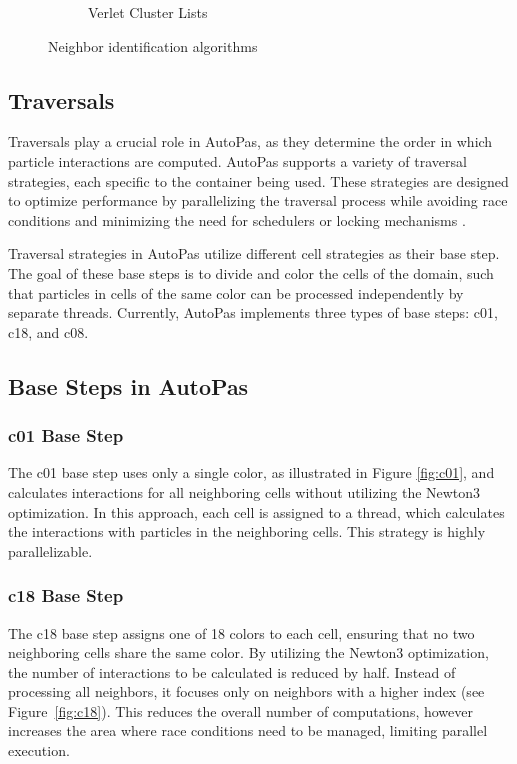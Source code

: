\begin{figure}[h!]
\begin{subfigure}{0.22\textwidth}
        \caption{\scriptsize Verlet Cluster Lists}
        \label{fig:verletclusters}
    \end{subfigure}
    \caption{Neighbor identification algorithms \parencite{gratl2022n}}
\end{figure}



\subsection{Traversals}

Traversals play a crucial role in AutoPas, as they determine the order in which particle interactions are computed. AutoPas supports a variety of traversal strategies, each specific to the container being used. These strategies are designed to optimize performance by parallelizing the traversal process while avoiding race conditions and minimizing the need for schedulers or locking mechanisms \parencite{gratl2019autopas}.

Traversal strategies in AutoPas utilize different cell strategies as their base step. The goal of these base steps is to divide and color the cells of the domain, such that particles in cells of the same color can be processed independently by separate threads. Currently, AutoPas implements three types of base steps: c01, c18, and c08. 

\subsection{Base Steps in AutoPas}

\subsubsection{c01 Base Step} The c01 base step uses only a single color, as illustrated in Figure \ref{fig:c01}, and calculates interactions for all neighboring cells without utilizing the Newton3 optimization. In this approach, each cell is assigned to a thread, which calculates the interactions with particles in the neighboring cells. This strategy is highly parallelizable.

\subsubsection{c18 Base Step} The c18 base step assigns one of 18 colors to each cell, ensuring that no two neighboring cells share the same color. By utilizing the Newton3 optimization, the number of interactions to be calculated is reduced by half. Instead of processing all neighbors, it focuses only on neighbors with a higher index (see Figure~\ref{fig:c18}). This reduces the overall number of computations, however increases the area where race conditions need to be managed, limiting parallel execution.

